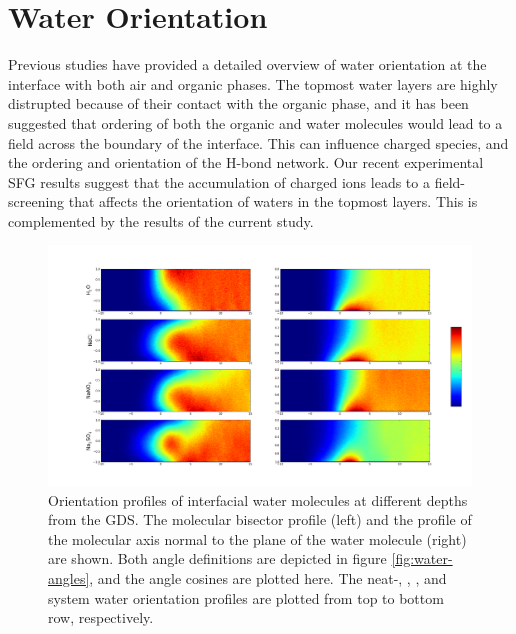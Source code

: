 \section{Water Orientation}

Previous studies have provided a detailed overview of water orientation at the interface with both air and organic phases.\cite{McFearin2009,Hore2008,Fan2009,Wick2006c,Wick2008a} The topmost water layers are highly distrupted because of their contact with the organic phase, and it has been suggested that ordering of both the organic and water molecules would lead to a field across the boundary of the interface.\cite{McFearin2009,Hore2008} This can influence charged species, and the ordering and orientation of the H-bond network. Our recent experimental SFG results suggest that the accumulation of charged ions leads to a field-screening that affects the orientation of waters in the topmost layers. This is complemented by the results of the current study.

\begin{figure}[h!]
\begin{center}
	\includegraphics[scale=1.0]{images/h2o-2dhistograms.png}
	\caption{Orientation profiles of interfacial water molecules at different depths from the GDS. The molecular bisector profile (left) and the profile of the molecular axis normal to the plane of the water molecule (right) are shown. Both angle definitions are depicted in figure \ref{fig:water-angles}, and the angle cosines are plotted here. The neat-\wat, \nacl, \sodnit, and \sodsul system water orientation profiles are plotted from top to bottom row, respectively.}
	\label{fig:2dhisto}
\end{center}
\end{figure}

